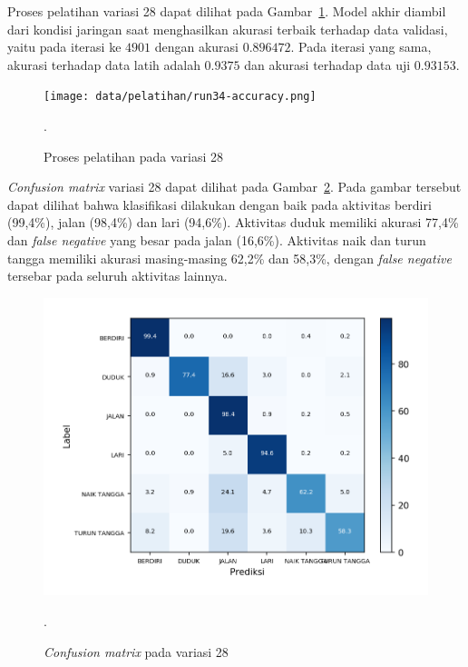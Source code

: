 Proses pelatihan variasi 28 dapat dilihat pada Gambar~\ref{gambar:run34-training}. Model akhir diambil dari kondisi jaringan saat menghasilkan akurasi terbaik terhadap data validasi, yaitu pada iterasi ke $4901$ dengan akurasi $0.896472$. Pada iterasi yang sama, akurasi terhadap data latih adalah $0.9375$ dan akurasi terhadap data uji  $0.93153$.

\begin{figure}[h!]
    \centering
    \texttt{[image: data/pelatihan/run34-accuracy.png]}
    \caption{Proses pelatihan pada variasi 28}.
    \label{gambar:run34-training}
\end{figure}

\textit{Confusion matrix} variasi 28 dapat dilihat pada Gambar~\ref{gambar:run34-confusion-martix}. Pada gambar tersebut dapat dilihat bahwa klasifikasi dilakukan dengan baik pada aktivitas berdiri (99,4\%), jalan (98,4\%) dan lari (94,6\%). Aktivitas duduk memiliki akurasi 77,4\% dan \textit{false negative} yang besar pada jalan (16,6\%). Aktivitas naik dan turun tangga memiliki akurasi masing-masing 62,2\% dan 58,3\%, dengan \textit{false negative} tersebar pada seluruh aktivitas lainnya.

\begin{figure}[h!]
    \centering
    \includegraphics[width=13cm]{gambar/hasil-pembahasan/run34-confusion-matrix.png}
    \caption{\textit{Confusion matrix} pada variasi 28}.
    \label{gambar:run34-confusion-martix}
\end{figure}

